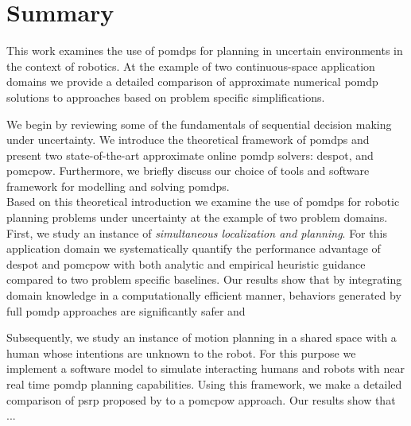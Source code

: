 \chapter{Summary}\label{chap:summary}

This work examines the use of \acfp{pomdp} for planning in uncertain
environments in the context of robotics. At the example of two continuous-space
application domains we provide a detailed comparison of approximate numerical
\ac{pomdp} solutions to approaches based on problem specific simplifications.

We begin by reviewing some of the fundamentals of sequential decision making
under uncertainty. We introduce the theoretical framework of \acp{pomdp} and
present two state-of-the-art approximate online \ac{pomdp} solvers:
\acf{despot}, and \acf{pomcpow}. Furthermore, we briefly discuss our choice of
tools and software framework for modelling and solving
\acp{pomdp}.\\
Based on this theoretical introduction we examine the use of \acp{pomdp} for
robotic planning problems under uncertainty at the example of two problem
domains.\\
First, we study an instance of \emph{simultaneous localization and planning}.
For this application domain we systematically quantify the performance
advantage of \ac{despot} and \ac{pomcpow} with both analytic and empirical
heuristic guidance compared to two problem specific baselines. Our
results show that by integrating domain knowledge in a computationally
efficient manner, behaviors generated by full \ac{pomdp} approaches are significantly
safer and

Subsequently, we study an instance of motion planning in a shared space with
a human whose intentions are unknown to the robot. For this purpose we implement a
software model to simulate interacting humans and robots with near real time
\ac{pomdp} planning capabilities. Using this framework, we make a detailed
comparison of \acf{psrp} proposed by \cite{fisac2018probabilistically} to
a \ac{pomcpow} approach.
Our results show that ... 




